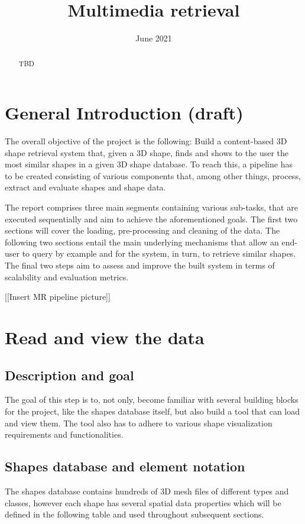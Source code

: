\documentclass{article}
\title{Multimedia retrieval}
\date{June 2021}
\begin{document}
\maketitle
\begin{abstract}
TBD


 
\end{abstract}


\section{General Introduction (draft)}
The overall objective of the project is the following: Build a content-based 3D shape retrieval system that, given a 3D shape, finds and shows to the user the most similar shapes in a given 3D shape database. To reach this, a pipeline has to be created consisting of various components that, among other things, process, extract and evaluate shapes and shape data. 

The report comprises three main segments containing various sub-tasks, that are executed sequentially and aim to achieve the aforementioned goals. The first two sections will cover the loading, pre-processing and cleaning of the data. The following two sections entail the main underlying mechanisms that allow an end-user to query by example and for the system, in turn, to retrieve similar shapes. The final two steps aim to assess and improve the built system in terms of scalability and evaluation metrics.

[[Insert MR pipeline picture]]

\section{Read and view the data}

\subsection{Description and goal}
The goal of this step is to, not only, become familiar with several building blocks for the project, like the shapes database itself, but also build a tool that can load and view them. The tool also has to adhere to various shape visualization requirements and functionalities.

\subsection{Shapes database and element notation}
The shapes database contains hundreds of 3D mesh files of different types and classes, however each shape has several spatial data properties which will be defined in the following table and used throughout subsequent sections.
\end{document}
